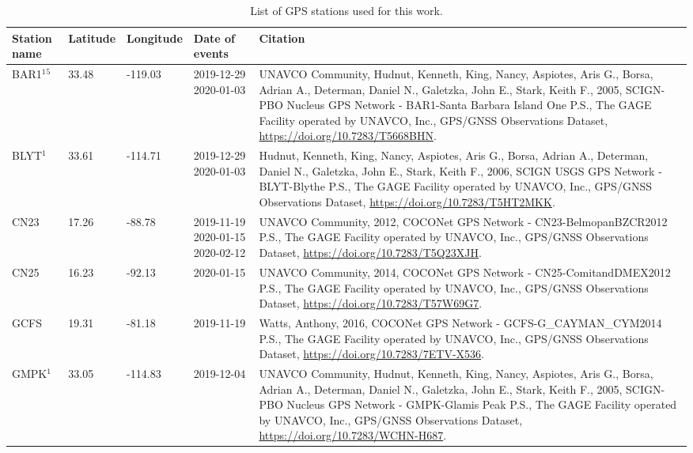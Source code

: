 \documentclass[times,twocolumn,final,authoryear]{elsarticle}
\begin{document}
\clearpage
\onecolumn
\begin{landscape}
  \begin{longtable}{lllp{4cm}p{10cm}}
      \caption{List of GPS stations used for this work.}
      \label{tab:table-stations}
      \endfirsthead
      \endhead
    \hline
    Station name & Latitude & Longitude & Date of events  & Citation \\\hline
    BAR1\hyperlink{Hudnut}{${}^1$}\hyperlink{Hudnut2}{${}^5$}& 33.48 & -119.03 & 2019-12-29 2020-01-03 & UNAVCO Community, Hudnut, Kenneth, King, Nancy, Aspiotes, Aris G., Borsa, Adrian A., Determan, Daniel N., Galetzka, John E., Stark, Keith F., 2005, SCIGN-PBO Nucleus GPS Network - BAR1-Santa Barbara Island One P.S., The GAGE Facility operated by UNAVCO, Inc., GPS/GNSS Observations Dataset, \url{https://doi.org/10.7283/T5668BHN}.\\
    BLYT\hyperlink{Hudnut}{${}^1$} & 33.61 & -114.71 & 2019-12-29 2020-01-03 & Hudnut, Kenneth, King, Nancy, Aspiotes, Aris G., Borsa, Adrian A., Determan, Daniel N., Galetzka, John E., Stark, Keith F., 2006, SCIGN USGS GPS Network - BLYT-Blythe P.S., The GAGE Facility operated by UNAVCO, Inc., GPS/GNSS Observations Dataset, \url{https://doi.org/10.7283/T5HT2MKK}.\\
    CN23 & 17.26 & -88.78 & 2019-11-19 2020-01-15 2020-02-12& UNAVCO Community, 2012, COCONet GPS Network - CN23-BelmopanBZCR2012 P.S., The GAGE Facility operated by UNAVCO, Inc., GPS/GNSS Observations Dataset, \url{https://doi.org/10.7283/T5Q23XJH}.\\
    CN25 & 16.23 & -92.13 & 2020-01-15 & UNAVCO Community, 2014, COCONet GPS Network - CN25-ComitandDMEX2012 P.S., The GAGE Facility operated by UNAVCO, Inc., GPS/GNSS Observations Dataset, \url{https://doi.org/10.7283/T57W69G7}.\\
    GCFS & 19.31 & -81.18 & 2019-11-19& Watts, Anthony, 2016, COCONet GPS Network - GCFS-G\_CAYMAN\_CYM2014 P.S., The GAGE Facility operated by UNAVCO, Inc., GPS/GNSS Observations Dataset, \url{https://doi.org/10.7283/7ETV-X536}.\\
    GMPK\hyperlink{Hudnut}{${}^1$} & 33.05 & -114.83 & 2019-12-04 & UNAVCO Community, Hudnut, Kenneth, King, Nancy, Aspiotes, Aris G., Borsa, Adrian A., Determan, Daniel N., Galetzka, John E., Stark, Keith F., 2005, SCIGN-PBO Nucleus GPS Network - GMPK-Glamis Peak P.S., The GAGE Facility operated by UNAVCO, Inc., GPS/GNSS Observations Dataset, \url{https://doi.org/10.7283/WCHN-H687}.\\

\end{longtable}
\end{landscape}
\end{document}
